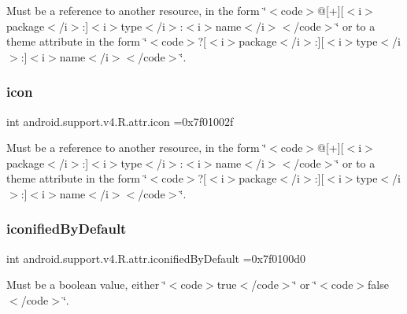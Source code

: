 Must be a reference to another resource, in the form \char`\"{}$<$code$>$@\mbox{[}+\mbox{]}\mbox{[}$<$i$>$package$<$/i$>$\+:\mbox{]}$<$i$>$type$<$/i$>$\+:$<$i$>$name$<$/i$>$$<$/code$>$\char`\"{} or to a theme attribute in the form \char`\"{}$<$code$>$?\mbox{[}$<$i$>$package$<$/i$>$\+:\mbox{]}\mbox{[}$<$i$>$type$<$/i$>$\+:\mbox{]}$<$i$>$name$<$/i$>$$<$/code$>$\char`\"{}. \mbox{\label{classandroid_1_1support_1_1v4_1_1R_1_1attr_a8b36ffbef72c995a962ef0ca3d414c7e}} 
\subsubsection{\texorpdfstring{icon}{icon}}
{\footnotesize\ttfamily int android.\+support.\+v4.\+R.\+attr.\+icon =0x7f01002f\hspace{0.3cm}{\ttfamily [static]}}

Must be a reference to another resource, in the form \char`\"{}$<$code$>$@\mbox{[}+\mbox{]}\mbox{[}$<$i$>$package$<$/i$>$\+:\mbox{]}$<$i$>$type$<$/i$>$\+:$<$i$>$name$<$/i$>$$<$/code$>$\char`\"{} or to a theme attribute in the form \char`\"{}$<$code$>$?\mbox{[}$<$i$>$package$<$/i$>$\+:\mbox{]}\mbox{[}$<$i$>$type$<$/i$>$\+:\mbox{]}$<$i$>$name$<$/i$>$$<$/code$>$\char`\"{}. \mbox{\label{classandroid_1_1support_1_1v4_1_1R_1_1attr_aa9f1d1d1b5e0a8ba7afe8a2eaecd953f}} 
\subsubsection{\texorpdfstring{iconified\+By\+Default}{iconifiedByDefault}}
{\footnotesize\ttfamily int android.\+support.\+v4.\+R.\+attr.\+iconified\+By\+Default =0x7f0100d0\hspace{0.3cm}{\ttfamily [static]}}

Must be a boolean value, either \char`\"{}$<$code$>$true$<$/code$>$\char`\"{} or \char`\"{}$<$code$>$false$<$/code$>$\char`\"{}. 

